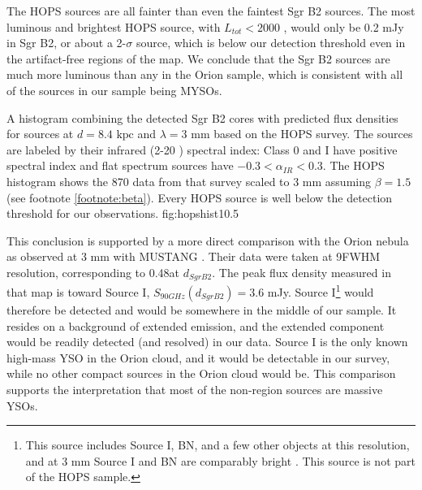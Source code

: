 \documentclass[twocolumn]{aastex61}
\newcommand{\dsgrb}{\ensuremath{8.4\textrm{~kpc}}\xspace}
\begin{document}
The HOPS sources are all fainter than even the faintest Sgr B2 sources.  The
most luminous
and brightest HOPS source, with $L_{tot}<2000$ \lsun, would only be 0.2 mJy in
Sgr B2, or about a 2-$\sigma$ source, which is below our detection threshold even in
the artifact-free regions of the map.  We  conclude that the Sgr B2 sources are
much more luminous than any in the Orion sample, which is consistent with all
of the sources in our sample being MYSOs.

{A histogram combining the detected Sgr B2 cores with predicted flux densities
for sources at $d=\dsgrb$ and $\lambda=3$ mm
based on the HOPS \citep{Furlan2016a} survey.  The sources are labeled by their
infrared (2-20 \um) spectral index: Class 0 and I have positive spectral index
and flat spectrum sources have $-0.3 < \alpha_{IR} < 0.3$. The HOPS histogram
shows the 870 \um data from that survey scaled to 3 mm
assuming $\beta=1.5$ (see footnote \ref{footnote:beta}).
Every HOPS source is well below the detection threshold for our observations.}
{fig:hopshist}{1}{0.5\textwidth}

This conclusion is supported by a more direct comparison with the Orion nebula
as observed at 3 mm with MUSTANG \citep[][Figure
\ref{fig:orioncompare}]{Dicker2009a}.  Their data were taken at
9\arcsec FWHM resolution, corresponding to 0.48\arcsec at $d_{Sgr B2}$.  The
peak flux density measured in that map is toward Source I, $S_{90 GHz}(d_{Sgr
B2}) = 3.6$ mJy.  Source I\footnote{This source includes Source I, BN, and a few
other objects at this resolution, and at 3 mm Source I and BN are comparably
bright \citep{Plambeck2013a}.  This source is not part of the HOPS sample.}
would therefore  be detected and would be
somewhere in the middle of our sample.  It resides on a background of
extended emission, and the
extended component would be readily detected (and resolved) in our data. 
Source I is the only known high-mass YSO in the Orion cloud, and it would
be detectable in our survey, while no other compact sources in the Orion cloud
would be.  This comparison supports the interpretation that most of the
non-\hii region sources are massive YSOs.

\end{document}
